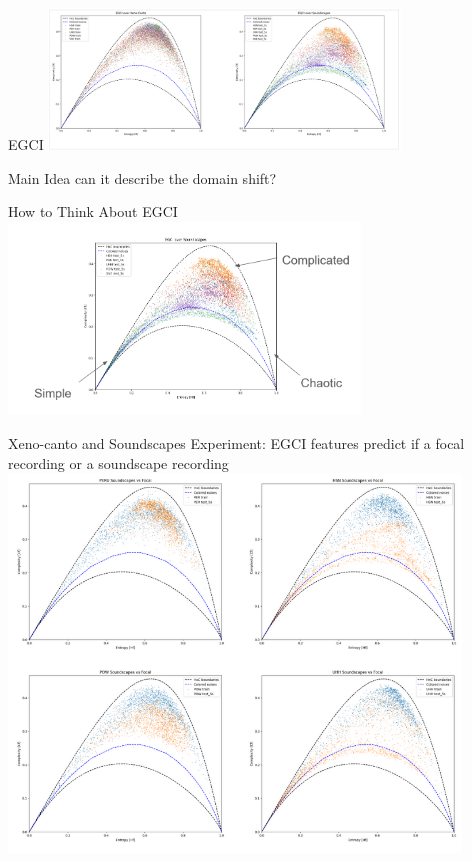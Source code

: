 

\begin{frame}{EGCI}
    \centering
    \includegraphics[height=0.7\textheight,width=0.7\textwidth,keepaspectratio]{images/EGCI_Example.png}
\end{frame}
\begin{frame}{Main Idea}
    can it describe the domain shift?
\end{frame}
\begin{frame}{How to Think About EGCI}
    \centering
    \includegraphics[height=0.7\textheight,width=0.7\textwidth,keepaspectratio]{images/intuition.png}
\end{frame}
\begin{frame}{Xeno-canto and Soundscapes}
    Experiment: EGCI features predict if a focal recording or a soundscape recording
    \centering
    \includegraphics[height=0.9\textheight,width=0.9\textwidth,keepaspectratio]{images/region_compare.png} 
\end{frame}
